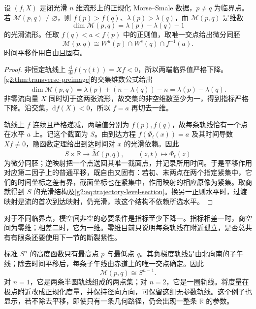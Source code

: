 \begin{proposition}\label{g2:prop:trajectory-quotient}
	设 \((f,X)\) 是闭光滑 \(n\) 维流形上的正规化 Morse--Smale 数据，\(p\ne q\) 为临界点。若 \(\mathcal M(p,q)\ne\varnothing\)，则 \(f(p)>f(q)\)、\(\lambda(p)>\lambda(q)\)，而 \(\mathcal M(p,q)\) 是维数
	\[
		\dim\mathcal M(p,q)=\lambda(p)-\lambda(q)-1
	\]
	的光滑流形。任取 \(f(q)<a<f(p)\) 中的正则值，取唯一交点给出微分同胚
	\begin{equation}\label{g2:eq:trajectory-level-section}
		\mathcal M(p,q)\cong
		W^u(p)\cap W^s(q)\cap f^{-1}(a).
	\end{equation}
	时间平移作用自由且固有。
\end{proposition}
\begin{proof}
	非恒定轨线上 \(\frac{\mathrm d}{\mathrm dt}f(\gamma(t))=Xf<0\)，所以两端临界值严格下降。\cref{g2:thm:transverse-preimage}的交集维数公式给出
	\[
		\dim\widetilde{\mathcal M}(p,q)
		=\lambda(p)+(n-\lambda(q))-n
		=\lambda(p)-\lambda(q).
	\]
	非零流向量 \(X\) 同时切于这两张流形，故交集的非空维数至少为一，得到指标严格下降。沿交集，\(\mathrm df(X)<0\)，所以 \(f=a\) 再切去一维。

	轨线上 \(f\) 连续且严格递减，两端值分别为 \(f(p),f(q)\)，故每条轨线恰有一个点在水平 \(a\) 上。记这个截面为 \(S\)。由到达方程 \(f(\Phi_t(x))=a\) 及其时间导数 \(Xf\ne0\)，隐函数定理给出到达时间对 \(x\) 的光滑依赖。因此
	\[
		S\times\mathbb R\longrightarrow\widetilde{\mathcal M}(p,q),
		\qquad(z,t)\longmapsto\Phi_t(z)
	\]
	为微分同胚；逆映射把一个点送回其唯一截面点，并记录所用时间。于是平移作用对应第二因子上的普通平移，既自由又固有：若初、末两点在两个指定紧集中，它们的时间坐标之差有界，截面坐标也在紧集中，作用映射的相应原像为紧集。取商就得到 \(S\) 的光滑结构及\eqref{g2:eq:trajectory-level-section}。换另一正则水平时，过渡映射是流的首次到达映射，仍光滑，故这个结构不依赖所选水平。
\end{proof}

对于不同临界点，模空间非空的必要条件是指标至少下降一。指标相差一时，商空间为零维；相差二时，它为一维。零维目前只说明每条轨线在附近孤立，是否总共有有限条还要使用下一节的断裂紧性。

\begin{example}\label{g2:exm:sphere-meridian-moduli}
	标准 \(S^n\) 的高度函数只有最高点 \(p\) 与最低点 \(q\)。其负梯度轨线是由北向南的子午线；除去时间平移后，每条子午线由赤道上的唯一交点确定。因此
	\[
		\mathcal M(p,q)\cong S^{n-1}.
	\]
	对 \(n=1\)，它是两条半圆轨线组成的两点集；对 \(n=2\)，它是一圈轨线。将度量在极点附近改成正规化度量，并保持径向方向，可保留这组无参数轨线。这个例子也显示，若不除去平移，即使只有一条几何路径，仍会出现一整条 \(\mathbb R\) 的参数。
\end{example}
